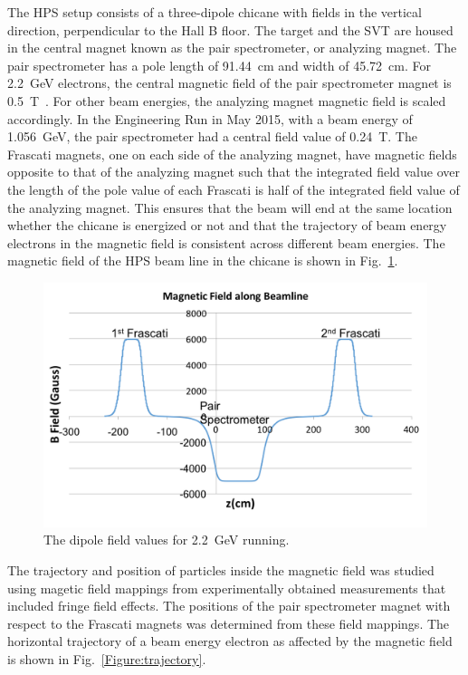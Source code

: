 The HPS setup consists of a three-dipole chicane with fields in the vertical direction, perpendicular to the Hall B floor. The target and the SVT are housed in the central magnet known as the pair spectrometer, or analyzing magnet. The pair spectrometer has a pole length of 91.44~cm and width of 45.72~cm. For 2.2~GeV electrons, the central magnetic field of the pair spectrometer magnet is 0.5~T~\cite{Takashi}. For other beam energies, the analyzing magnet magnetic field is scaled accordingly. In the Engineering Run in May 2015, with a beam energy of 1.056~GeV, the pair spectrometer had a central field value of 0.24~T. The Frascati magnets, one on each side of the analyzing magnet, have magnetic fields opposite to that of the analyzing magnet such that the integrated field value over the length of the pole value of each Frascati is half of the integrated field value of the analyzing magnet. This ensures that the beam will end at the same location whether the chicane is energized or not and that the trajectory of beam energy electrons in the magnetic field is consistent across different beam energies. The magnetic field of the HPS beam line in the chicane is shown in Fig.~\ref{Figure:bField}.

\begin{figure}[H]
  \centering
      \includegraphics[width=1.0\textwidth]{pics/experiment/bfield.png}
  \caption[HPS magnetic fields]{The dipole field values for 2.2~GeV running.}
  \label{Figure:bField}
\end{figure}

The trajectory and position of particles inside the magnetic field was studied using magetic field mappings from experimentally obtained measurements that included fringe field effects. The positions of the pair spectrometer magnet with respect to the Frascati magnets was determined from these field mappings. The horizontal trajectory of a beam energy electron as affected by the magnetic field is shown in Fig.~\ref{Figure:trajectory}.

